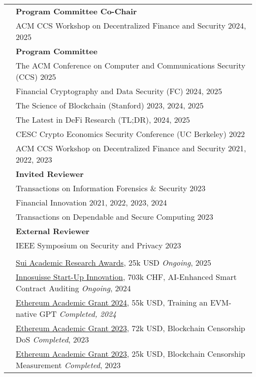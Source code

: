 \documentclass[letterpaper, 8pt]{article}
\newcommand{\corerankingAA}{\corebox{red}{30}{\xspace A* \xspace}\xspace}
\newcommand{\corerankingA}{\corebox{red}{15}{\xspace A \xspace}\xspace}
\begin{document}
\begin{longtable}{p{0.5in}p{5.5in}}
{\color{OliveGreen}{Services}}
& \textbf{Program Committee Co-Chair} \\
& ACM CCS Workshop on Decentralized Finance and Security  \hfill 2024, 2025 \\
& \textbf{Program Committee} \\
& \corerankingAA The ACM Conference on Computer and Communications Security (CCS) \hfill 2025 \\
& \corerankingA Financial Cryptography and Data Security (FC) \hfill 2024, 2025 \\
& The Science of Blockchain (Stanford) \hfill 2023, 2024, 2025 \\
& The Latest in DeFi Research (TL;DR), \hfill 2024, 2025 \\
& CESC Crypto Economics Security Conference (UC Berkeley) \hfill 2022 \\
& ACM CCS Workshop on Decentralized Finance and Security \hfill 2021, 2022, 2023 \\
& \textbf{Invited Reviewer} \\
& Transactions on Information Forensics \& Security \hfill 2023\\
& Financial Innovation \hfill 2021, 2022, 2023, 2024\\
& Transactions on Dependable and Secure Computing \hfill 2023\\
& \textbf{External Reviewer} \\
& \corerankingAA IEEE Symposium on Security and Privacy \hfill 2023 \\
\\
{\color{OliveGreen}{Grants}}
& \href{https://sui.io/research-awards}{Sui Academic Research Awards}, 25k USD \hfill \textit{Ongoing}, 2025 \\
& \href{https://www.innosuisse.ch/inno/en/home/promotion-of-national-projects/startup-innovationprojects/approved-start-up-innovation-projects.html}{Innosuisse Start-Up Innovation}, 703k CHF, AI-Enhanced Smart Contract Auditing \hfill \textit{Ongoing}, 2024 \\
& \href{https://blog.ethereum.org/2025/01/17/academic-grants-recipients}{Ethereum Academic Grant 2024}, 55k USD, Training an EVM-native GPT \hfill \textit{Completed, 2024}\\
& \href{https://blog.ethereum.org/2023/06/28/academic-grants-round-23}{Ethereum Academic Grant 2023}, 72k USD, Blockchain Censorship DoS \hfill \textit{Completed}, 2023 \\
& \href{https://blog.ethereum.org/2023/06/28/academic-grants-round-23}{Ethereum Academic Grant 2023}, 25k USD, Blockchain Censorship Measurement \hfill \textit{Completed}, 2023\\


\end{longtable}
\end{document}
